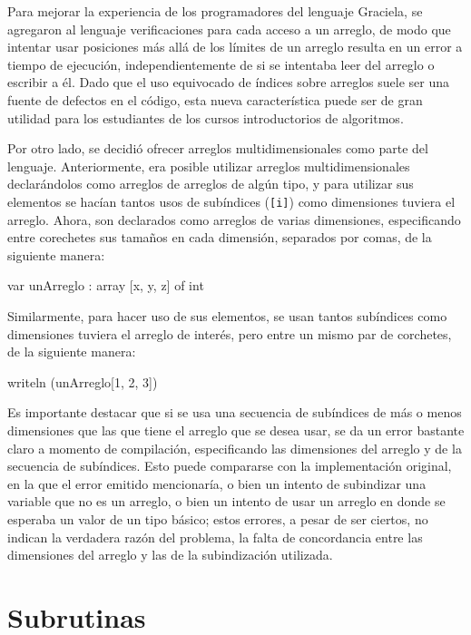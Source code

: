 Para mejorar la experiencia de los programadores del lenguaje Graciela, se
agregaron al lenguaje verificaciones para cada acceso a un arreglo, de modo que
intentar usar posiciones más allá de los límites de un arreglo resulta en un
error a tiempo de ejecución, independientemente de si se intentaba leer del
arreglo o escribir a él. Dado que el uso equivocado de índices sobre arreglos
suele ser una fuente de defectos en el código, esta nueva característica puede
ser de gran utilidad para los estudiantes de los cursos introductorios de
algoritmos.

Por otro lado, se decidió ofrecer arreglos multidimensionales como parte del
lenguaje. Anteriormente, era posible utilizar arreglos multidimensionales
declarándolos como arreglos de arreglos de algún tipo, y para utilizar sus
elementos se hacían tantos usos de subíndices (\texttt{[i]}) como dimensiones
tuviera el arreglo. Ahora, son declarados como arreglos de varias dimensiones,
especificando entre corechetes sus tamaños en cada dimensión, separados por
comas, de la siguiente manera:

\begin{gracielacode}
var unArreglo : array [x, y, z] of int
\end{gracielacode}

Similarmente, para hacer uso de sus elementos, se usan tantos subíndices como
dimensiones tuviera el arreglo de interés, pero entre un mismo par de corchetes,
de la siguiente manera:

\begin{gracielacode}
writeln (unArreglo[1, 2, 3])
\end{gracielacode}

Es importante destacar que si se usa una secuencia de subíndices de más o menos
dimensiones que las que tiene el arreglo que se desea usar, se da un error
bastante claro a momento de compilación, especificando las dimensiones del
arreglo y de la secuencia de subíndices. Esto puede compararse con la
implementación original, en la que el error emitido mencionaría, o bien un
intento de subindizar una variable que no es un arreglo, o bien un intento de
usar un arreglo en donde se esperaba un valor de un tipo básico; estos errores,
a pesar de ser ciertos, no indican la verdadera razón del problema, la falta de
concordancia entre las dimensiones del arreglo y las de la subindización
utilizada.

\section{Subrutinas}

